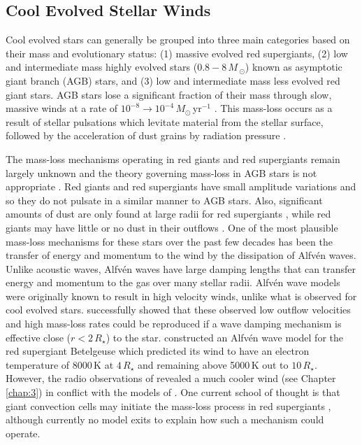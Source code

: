 \subsection{Cool Evolved Stellar Winds}\label{sec:1.4.3}
Cool evolved stars can generally be grouped into three main categories based on their mass and evolutionary status: (1) massive evolved red supergiants, (2) low and intermediate mass highly evolved stars ($0.8 - 8\,M\,_{\odot}$) known as asymptotic giant branch (AGB) stars, and (3) low and intermediate mass less evolved red giant stars. AGB stars lose a significant fraction of their mass through slow, massive winds at a rate of $10^{-8} \rightarrow 10^{-4}\,M_{\odot}$\,yr$^{-1}$ \citep{van_loon_2005}. This mass-loss occurs as a result of stellar pulsations \citep{habing_1996} which levitate material from the stellar surface, followed by the acceleration of dust grains by radiation pressure \citep{gehrz_1971}. 

The mass-loss mechanisms operating in red giants and red supergiants remain largely unknown and the theory governing mass-loss in AGB stars is not appropriate \citep{josselin_2007}. Red giants and red supergiants have small amplitude variations and so they do not pulsate in a similar manner to AGB stars. Also, significant amounts of dust are only found at large radii for red supergiants \citep{danchi_1994}, while red giants may have little or no dust in their outflows \citep{jones_2008}. One of the most plausible mass-loss mechanisms for these stars over the past few decades has been the transfer of energy and momentum to the wind by the dissipation of Alfv\'en waves. Unlike acoustic waves, Alfv\'en waves have large damping lengths that can transfer energy and momentum to the gas over many stellar radii. Alfv\'en wave models were originally known to result in high velocity winds, unlike what is observed for cool evolved stars. \cite{hartmann_1980} successfully showed that these observed low outflow velocities and high mass-loss rates could be reproduced if a wave damping mechanism is effective close ($r < 2\,R_{\star}$) to the star. \cite{hartmann_1984} constructed an Alfv\'en wave model for the red supergiant Betelgeuse which predicted its wind to have an electron temperature of 8000\,K at $4\,R_{\star}$ and remaining above 5000\,K out to $10\,R_{\star}$. However, the radio observations of \cite{lim_1998} revealed a much cooler wind (see Chapter \ref{chap:3}) in conflict with the models of \cite{hartmann_1984}. One current school of thought is that giant convection cells may initiate the mass-loss process in red supergiants \cite[e.g.,][]{lim_1998}, although currently no model exits to explain how such a mechanism could operate.

